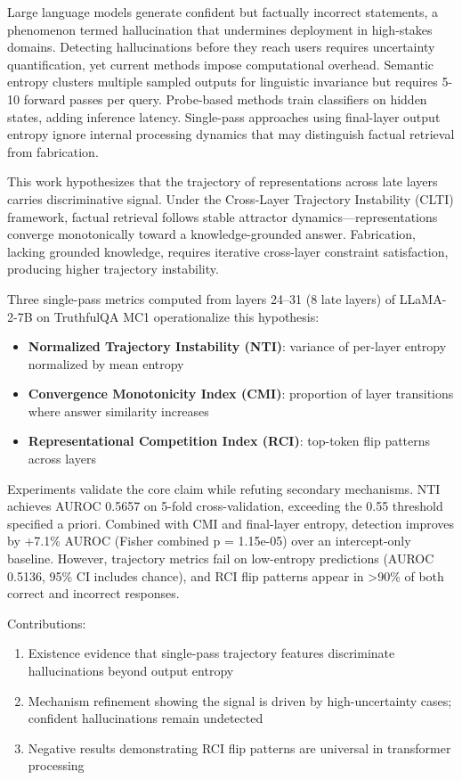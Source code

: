 
Large language models generate confident but factually incorrect statements, a phenomenon termed hallucination that undermines deployment in high-stakes domains. Detecting hallucinations before they reach users requires uncertainty quantification, yet current methods impose computational overhead. Semantic entropy clusters multiple sampled outputs for linguistic invariance but requires 5-10 forward passes per query. Probe-based methods train classifiers on hidden states, adding inference latency. Single-pass approaches using final-layer output entropy ignore internal processing dynamics that may distinguish factual retrieval from fabrication.

This work hypothesizes that the trajectory of representations across late layers carries discriminative signal. Under the Cross-Layer Trajectory Instability (CLTI) framework, factual retrieval follows stable attractor dynamics---representations converge monotonically toward a knowledge-grounded answer. Fabrication, lacking grounded knowledge, requires iterative cross-layer constraint satisfaction, producing higher trajectory instability.

Three single-pass metrics computed from layers 24--31 (8 late layers) of LLaMA-2-7B on TruthfulQA MC1 operationalize this hypothesis:
\begin{itemize}
\item \textbf{Normalized Trajectory Instability (NTI)}: variance of per-layer entropy normalized by mean entropy
\item \textbf{Convergence Monotonicity Index (CMI)}: proportion of layer transitions where answer similarity increases
\item \textbf{Representational Competition Index (RCI)}: top-token flip patterns across layers
\end{itemize}

Experiments validate the core claim while refuting secondary mechanisms. NTI achieves AUROC 0.5657 on 5-fold cross-validation, exceeding the 0.55 threshold specified a priori. Combined with CMI and final-layer entropy, detection improves by +7.1\% AUROC (Fisher combined p = 1.15e-05) over an intercept-only baseline. However, trajectory metrics fail on low-entropy predictions (AUROC 0.5136, 95\% CI includes chance), and RCI flip patterns appear in >90\% of both correct and incorrect responses.

Contributions:
\begin{enumerate}
\item Existence evidence that single-pass trajectory features discriminate hallucinations beyond output entropy
\item Mechanism refinement showing the signal is driven by high-uncertainty cases; confident hallucinations remain undetected
\item Negative results demonstrating RCI flip patterns are universal in transformer processing
\end{enumerate}

